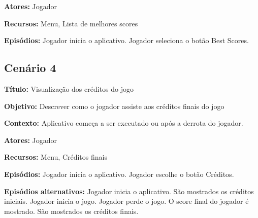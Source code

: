 \textbf{Atores:} Jogador

\textbf{Recursos:} Menu, Lista de melhores scores

\textbf{Episódios:} Jogador inicia o aplicativo. Jogador seleciona o botão Best Scores. 

\subsection{Cenário 4}

\textbf{Título:} Visualização dos créditos do jogo

\textbf{Objetivo:} Descrever como o jogador assiste aos créditos finais do jogo

\textbf{Contexto:} Aplicativo começa a ser executado ou após a derrota do jogador.

\textbf{Atores:} Jogador

\textbf{Recursos:} Menu, Créditos finais

\textbf{Episódios:} Jogador inicia o aplicativo. Jogador escolhe o botão Créditos.

\textbf{Episódios alternativos:} Jogador inicia o aplicativo. São mostrados os créditos iniciais. Jogador inicia o jogo. Jogador perde o jogo. O score final do jogador é mostrado. São mostrados os créditos finais.

